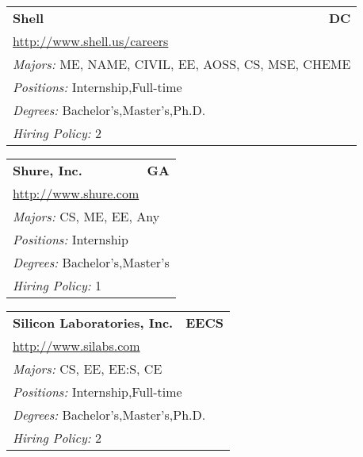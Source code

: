 \documentclass[twoside]{article}
\begin{document}
\begin{center}
\begin{multicols}{3}
\begin{FlushLeft}
\begin{minipage}{.9\columnwidth}
\end{minipage}
 
\begin{minipage}{.9\columnwidth}\begin{tabularx}{.95\columnwidth}{Xr}
                 {\Large\bf Shell} & {\Large\bf DC}\\
    \multicolumn{2}{p{.95\columnwidth}}{\url{http://www.shell.us/careers}}\\
    \multicolumn{2}{p{.95\columnwidth}}{\emph{Majors:} ME, NAME, CIVIL, EE, AOSS, CS, MSE, CHEME}\\
    \multicolumn{2}{p{.95\columnwidth}}{\emph{Positions:} Internship,Full-time}\\
    \multicolumn{2}{p{.95\columnwidth}}{\emph{Degrees:} Bachelor's,Master's,Ph.D.}\\
    \multicolumn{2}{p{.95\columnwidth}}{\emph{Hiring Policy:} 2}\\
    \end{tabularx}
    
\end{minipage}
 
\begin{minipage}{.9\columnwidth}\begin{tabularx}{.95\columnwidth}{Xr}
                 {\Large\bf Shure, Inc.} & {\Large\bf GA}\\
    \multicolumn{2}{p{.95\columnwidth}}{\url{http://www.shure.com}}\\
    \multicolumn{2}{p{.95\columnwidth}}{\emph{Majors:} CS, ME, EE, Any}\\
    \multicolumn{2}{p{.95\columnwidth}}{\emph{Positions:} Internship}\\
    \multicolumn{2}{p{.95\columnwidth}}{\emph{Degrees:} Bachelor's,Master's}\\
    \multicolumn{2}{p{.95\columnwidth}}{\emph{Hiring Policy:} 1}\\
    \end{tabularx}
    
\end{minipage}
 
\begin{minipage}{.9\columnwidth}\begin{tabularx}{.95\columnwidth}{Xr}
                 {\Large\bf Silicon Laboratories, Inc.} & {\Large\bf EECS}\\
    \multicolumn{2}{p{.95\columnwidth}}{\url{http://www.silabs.com}}\\
    \multicolumn{2}{p{.95\columnwidth}}{\emph{Majors:} CS, EE, EE:S, CE}\\
    \multicolumn{2}{p{.95\columnwidth}}{\emph{Positions:} Internship,Full-time}\\
    \multicolumn{2}{p{.95\columnwidth}}{\emph{Degrees:} Bachelor's,Master's,Ph.D.}\\
    \multicolumn{2}{p{.95\columnwidth}}{\emph{Hiring Policy:} 2}\\
    \end{tabularx}
    

\end{minipage}
\end{FlushLeft}
\end{multicols}
\end{center}
\end{document}
